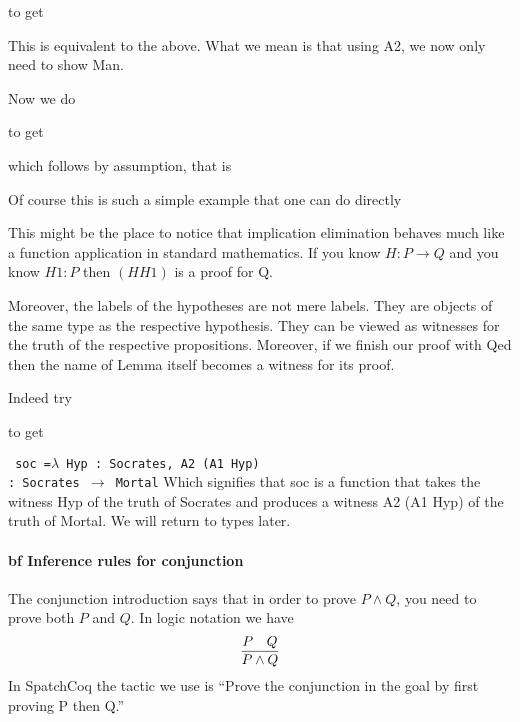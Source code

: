\begin{itemize}
 
 to get

This is equivalent to the above. What we mean is that using A2, we now only need to show Man.

Now we do
 
 to get
 
 which follows by assumption, that is
 
 
 Of course this is such a simple example that one can do directly 
 
 
\begin{tcolorbox}[colback=red!5!white,colframe=black]
This might be the place to notice that implication elimination behaves much like a function application in standard mathematics. If you know $H:P\rightarrow Q$  and you know $H1:P$ then $(H H1)$ is a proof for Q. 

Moreover, the labels of the hypotheses are not mere labels. They are objects of the same type as the respective hypothesis. They can be viewed as witnesses for the truth of the respective propositions. Moreover, if we finish our proof with Qed then the name of Lemma itself becomes a witness for its proof.

 
 \end{tcolorbox}
Indeed try

to get 

\texttt{
soc =$ \lambda$ Hyp : Socrates, A2 (A1 Hyp) \\
     : Socrates $\rightarrow$ Mortal}
 Which signifies that soc is a function  that takes the witness Hyp of the truth of Socrates and produces a witness A2 (A1 Hyp) of the truth of Mortal.
 We will return to types later.





\paragraph{bf Inference rules for conjunction}
The conjunction introduction says that in order to prove $P\land Q$, you need to prove both $P$ and $Q$. In logic notation we have
$$\infer{P\land Q}{P & Q}$$
In SpatchCoq the tactic we use is ``Prove the conjunction in the goal by first proving P then Q.''


\end{itemize}
